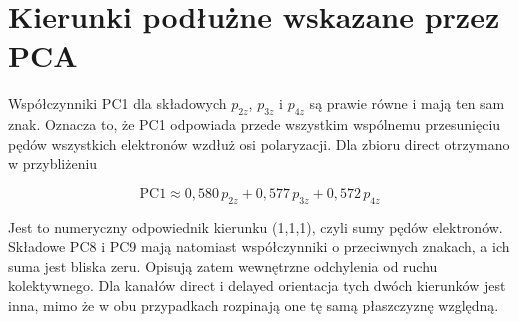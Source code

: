 \documentclass[12pt,letterpaper,oneside]{report}
\numberwithin{equation}{chapter}
\numberwithin{figure}{chapter}
\numberwithin{table}{chapter}
\begin{document}
\section{Kierunki podłużne wskazane przez PCA}

Współczynniki PC1 dla składowych \ensuremath{p_{2z}}, \ensuremath{p_{3z}} i \ensuremath{p_{4z}} są prawie równe i mają
ten sam znak. Oznacza to, że PC1 odpowiada przede wszystkim wspólnemu
przesunięciu pędów wszystkich elektronów wzdłuż osi polaryzacji. Dla
zbioru direct otrzymano w przybliżeniu

\begin{equation}
\mathrm{PC1}\approx 0{,}580\,p_{2z}+0{,}577\,p_{3z}+0{,}572\,p_{4z}
\label{eq:4}
\end{equation}

Jest to numeryczny odpowiednik kierunku (1,1,1), czyli sumy pędów
elektronów. Składowe PC8 i PC9 mają natomiast współczynniki o
przeciwnych znakach, a ich suma jest bliska zeru. Opisują zatem
wewnętrzne odchylenia od ruchu kolektywnego. Dla kanałów direct i
delayed orientacja tych dwóch kierunków jest inna, mimo że w obu
przypadkach rozpinają one tę samą płaszczyznę względną.
\end{document}
